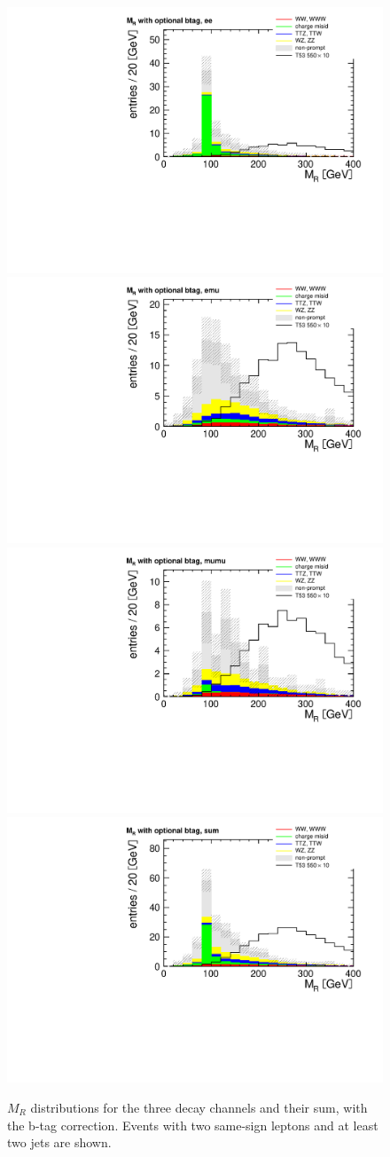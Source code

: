 \begin{figure}[htb]
    \centering
    \includegraphics[width=.7\textwidth]{images/pdf/mr_optional_btag_ee_0}
    \includegraphics[width=.7\textwidth]{images/pdf/mr_optional_btag_emu_0}
    \includegraphics[width=.7\textwidth]{images/pdf/mr_optional_btag_mumu_0}
    \includegraphics[width=.7\textwidth]{images/pdf/mr_optional_btag_sum_0}
    \caption{$M_R$ distributions for the three decay channels and their sum,
        with the b-tag correction. Events with two same-sign leptons and at least
two jets are shown.}
    \label{fig:mr_optional_btag}
\end{figure}

